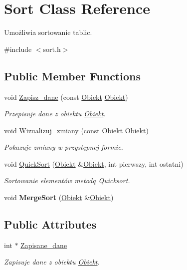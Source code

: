 \hypertarget{class_sort}{\section{\-Sort \-Class \-Reference}
\label{class_sort}
}


\-Umożliwia sortowanie tablic.  




{\ttfamily \#include $<$sort.\-h$>$}

\subsection*{\-Public \-Member \-Functions}
\begin{DoxyCompactItemize}
\item 
void \hyperlink{class_sort_a54aa136bc24c37b9805621245eaab424}{\-Zapisz\-\_\-dane} (const \hyperlink{class_obiekt}{\-Obiekt} \hyperlink{class_obiekt}{\-Obiekt})
\begin{DoxyCompactList}\small\item\em \-Przepisuje dane z obiektu \hyperlink{class_obiekt}{\-Obiekt}. \end{DoxyCompactList}\item 
void \hyperlink{class_sort_ad1b1944c3335052502a9e8713057f764}{\-Wizualizuj\-\_\-zmiany} (const \hyperlink{class_obiekt}{\-Obiekt} \hyperlink{class_obiekt}{\-Obiekt})
\begin{DoxyCompactList}\small\item\em \-Pokazuje zmiany w przystępnej formie. \end{DoxyCompactList}\item 
void \hyperlink{class_sort_a99988d3b0122b194cdf0491f5d2cd968}{\-Quick\-Sort} (\hyperlink{class_obiekt}{\-Obiekt} \&\hyperlink{class_obiekt}{\-Obiekt}, int pierwszy, int ostatni)
\begin{DoxyCompactList}\small\item\em \-Sortowanie elementów metodą \-Quicksort. \end{DoxyCompactList}\item 
\hypertarget{class_sort_ab254fad5c26f6b47e766854ac70a4b2b}{void {\bfseries \-Merge\-Sort} (\hyperlink{class_obiekt}{\-Obiekt} \&\hyperlink{class_obiekt}{\-Obiekt})}\label{class_sort_ab254fad5c26f6b47e766854ac70a4b2b}

\end{DoxyCompactItemize}
\subsection*{\-Public \-Attributes}
\begin{DoxyCompactItemize}
\item 
int $\ast$ \hyperlink{class_sort_a6cb891a8e545fdb636d10bec406fef32}{\-Zapisane\-\_\-dane}
\begin{DoxyCompactList}\small\item\em \-Zapisuje dane z obiektu \hyperlink{class_obiekt}{\-Obiekt}. \end{DoxyCompactList}\end{DoxyCompactItemize}


